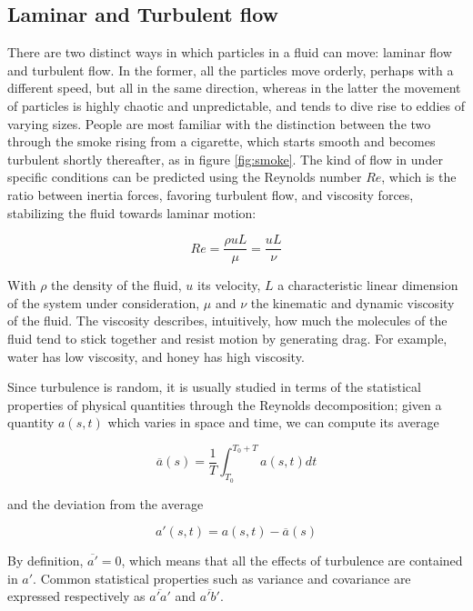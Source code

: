 \documentclass[a4paper]{book}
\begin{document}
\subsection{Laminar and Turbulent flow}
There are two distinct ways in which particles in a fluid can move: laminar flow and turbulent flow. In the former, all the particles move orderly, perhaps with a different speed, but all in the same direction, whereas in the latter the movement of particles is highly chaotic and unpredictable, and tends to dive rise to eddies of varying sizes. People are most familiar with the distinction between the two through the smoke rising from a cigarette, which starts smooth and becomes turbulent shortly thereafter, as in figure \ref{fig:smoke}. The kind of flow in under specific conditions can be predicted using the Reynolds number $Re$, which is the ratio between inertia forces, favoring turbulent flow, and viscosity forces, stabilizing the fluid towards laminar motion:

$$
Re=\frac{\rho u L}{\mu}=\frac{uL}{\nu}
$$

With $\rho$ the density of the fluid, $u$ its velocity, $L$ a characteristic linear dimension of the system under consideration, $\mu$ and $\nu$ the kinematic and dynamic viscosity of the fluid. The viscosity describes, intuitively, how much the molecules of the fluid tend to stick together and resist motion by generating drag. For example, water has low viscosity, and honey has high viscosity.

Since turbulence is random, it is usually studied in terms of the statistical properties of physical quantities through the Reynolds decomposition; given a quantity $a(s,t)$ which varies in space and time, we can compute its average

$$
\overline{a}(s)=\frac{1}{T}\int_{T_0}^{T_0+T}a(s,t)dt
$$

and the deviation from the average

$$
a'(s,t)=a(s,t)-\overline{a}(s)
$$

By definition, $\overline{a'}=0$, which means that all the effects of turbulence are contained in $a'$. Common statistical properties such as variance and covariance are expressed respectively as $\overline{a'a'}$ and $\overline{a'b'}$.
\end{document}
